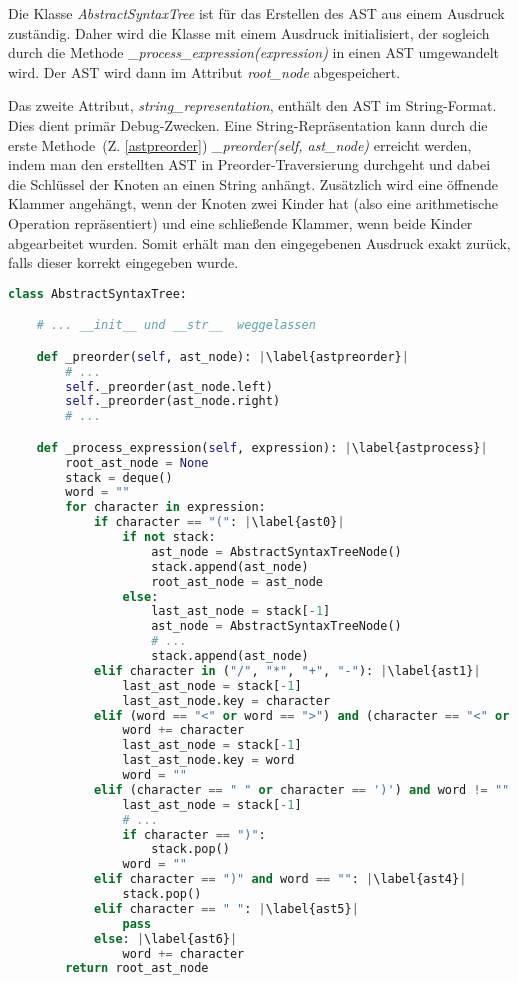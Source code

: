 Die Klasse \textit{AbstractSyntaxTree} ist für das Erstellen des AST aus einem Ausdruck zuständig. 
Daher wird die Klasse mit einem Ausdruck initialisiert, der sogleich durch die 
Methode \textit{\_process\_expression(expression)} in einen AST umgewandelt wird. Der AST wird dann im Attribut \textit{root\_node} abgespeichert.

Das zweite Attribut, \textit{string\_representation}, enthält den AST im String-Format. Dies dient primär Debug-Zwecken.
Eine String-Repräsentation kann durch die erste Methode~(Z. \ref{astpreorder}) \textit{\_preorder(self, ast\_node)} erreicht werden,
indem man den erstellten AST in Preorder-Traversierung durchgeht und dabei die Schlüssel der Knoten an einen String anhängt.
Zusätzlich wird eine öffnende Klammer angehängt, wenn der Knoten zwei Kinder hat (also eine arithmetische Operation repräsentiert) und eine schließende Klammer,
wenn beide Kinder abgearbeitet wurden. Somit erhält man den eingegebenen Ausdruck exakt zurück, falls dieser korrekt eingegeben wurde.

\begin{lstlisting}[language=Python, escapechar=|, caption=Klasse \textit{AbstractSyntaxTree}, label={lst:ast}]
class AbstractSyntaxTree:

    # ... __init__ und __str__  weggelassen 

    def _preorder(self, ast_node): |\label{astpreorder}|
        # ...
        self._preorder(ast_node.left)
        self._preorder(ast_node.right)
        # ...

    def _process_expression(self, expression): |\label{astprocess}|
        root_ast_node = None
        stack = deque()
        word = ""
        for character in expression:
            if character == "(": |\label{ast0}|
                if not stack:
                    ast_node = AbstractSyntaxTreeNode()
                    stack.append(ast_node)
                    root_ast_node = ast_node
                else:
                    last_ast_node = stack[-1]
                    ast_node = AbstractSyntaxTreeNode()
                    # ...
                    stack.append(ast_node)
            elif character in ("/", "*", "+", "-"): |\label{ast1}|
                last_ast_node = stack[-1]
                last_ast_node.key = character
            elif (word == "<" or word == ">") and (character == "<" or character == ">"): |\label{ast2}|
                word += character
                last_ast_node = stack[-1]
                last_ast_node.key = word
                word = ""
            elif (character == " " or character == ')') and word != "": |\label{ast3}|
                last_ast_node = stack[-1]
                # ...
                if character == ")":
                    stack.pop()
                word = ""
            elif character == ")" and word == "": |\label{ast4}|
                stack.pop()
            elif character == " ": |\label{ast5}|
                pass
            else: |\label{ast6}|
                word += character
        return root_ast_node
\end{lstlisting}


